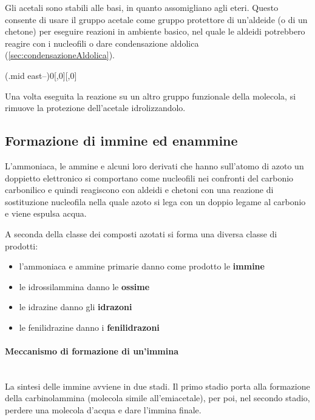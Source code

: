 Gli acetali sono stabili alle basi, in quanto assomigliano agli eteri. Questo consente di usare il gruppo acetale come gruppo protettore di un'aldeide (o di un chetone) per eseguire reazioni in ambiente basico, nel quale le aldeidi potrebbero reagire con i nucleofili o dare condensazione aldolica (\autoref{sec:condensazioneAldolica}).

\begin{reaction}
	\arrow(.mid east--){0}[,0]\+[,0]
	\arrow{->[\Hpiu{1}]}
\end{reaction}

Una volta eseguita la reazione su un altro gruppo funzionale della molecola, si rimuove la protezione dell'acetale idrolizzandolo.


\subsection{Formazione di immine ed enammine}
L'ammoniaca, le ammine e alcuni loro derivati che hanno sull'atomo di azoto un doppietto elettronico si comportano come nucleofili nei confronti del carbonio carbonilico e quindi reagiscono con aldeidi e chetoni con una reazione di sostituzione nucleofila nella quale azoto si lega con un doppio legame al carbonio e viene espulsa acqua.

A seconda della classe dei composti azotati si forma una diversa classe di prodotti:
\begin{itemize}
	\item l'ammoniaca e ammine primarie danno come prodotto le \textbf{immine}
	\item le idrossilammina danno le \textbf{ossime}
	\item le idrazine danno gli \textbf{idrazoni}
	\item le fenilidrazine danno i \textbf{fenilidrazoni}
\end{itemize}

\paragraph{Meccanismo di formazione di un'immina}\mbox{}\\
La sintesi delle immine avviene in due stadi. Il primo stadio porta alla formazione della carbinolammina (molecola simile all'emiacetale), per poi, nel secondo stadio, perdere una molecola d'acqua e dare l'immina finale.


